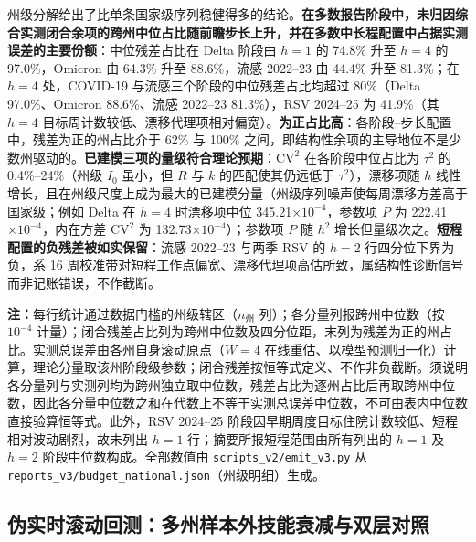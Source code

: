 \documentclass[11pt,a4paper]{article}
\theoremstyle{plain}
\theoremstyle{definition}
\begin{document}
州级分解给出了比单条国家级序列稳健得多的结论。\textbf{在多数报告阶段中，未归因综合实测闭合余项的跨州中位占比随前瞻步长上升，并在多数中长程配置中占据实测误差的主要份额}：中位残差占比在 Delta 阶段由 $h=1$ 的 74.8\% 升至 $h=4$ 的 97.0\%，Omicron 由 64.3\% 升至 88.6\%，流感 2022--23 由 44.4\% 升至 81.3\%；在 $h=4$ 处，COVID-19 与流感三个阶段的中位残差占比均超过 80\%（Delta 97.0\%、Omicron 88.6\%、流感 2022--23 81.3\%），RSV 2024--25 为 41.9\%（其 $h=4$ 目标周计数较低、漂移代理项相对偏宽）。\textbf{为正占比高}：各阶段--步长配置中，残差为正的州占比介于 62\% 与 100\% 之间，即结构性余项的主导地位不是少数州驱动的。\textbf{已建模三项的量级符合理论预期}：$\text{CV}^2$ 在各阶段中位占比为 $\tau^2$ 的 0.4\%--24\%（州级 $I_0$ 虽小，但 $R$ 与 $k$ 的匹配使其仍远低于 $\tau^2$），漂移项随 $h$ 线性增长，且在州级尺度上成为最大的已建模分量（州级序列噪声使每周漂移方差高于国家级；例如 Delta 在 $h=4$ 时漂移项中位 345.21$\times10^{-4}$，参数项 $P$ 为 222.41$\times10^{-4}$，内在方差 $\text{CV}^2$ 为 132.73$\times10^{-4}$）；参数项 $P$ 随 $h^2$ 增长但量级次之。\textbf{短程配置的负残差被如实保留}：流感 2022--23 与两季 RSV 的 $h=2$ 行四分位下界为负，系 16 周校准带对短程工作点偏宽、漂移代理项高估所致，属结构性诊断信号而非记账错误，不作截断。

\begin{table}[htbp]
\centering
\footnotesize
\caption{四项预测误差记账的州级分解（各分量绝对值 $\times 10^{-4}$ 的中位数与闭合残差占比分布）}
\label{tab:budget_four}
\resizebox{\textwidth}{!}{%
%
}
\vspace{2pt}
\begin{flushleft}
\scriptsize \textbf{注：}每行统计通过数据门槛的州级辖区（$n_{\text{州}}$ 列）；各分量列报跨州中位数（按 $10^{-4}$ 计量）；闭合残差占比列为跨州中位数及四分位距，末列为残差为正的州占比。实测总误差由各州自身滚动原点（$W=4$ 在线重估、以模型预测归一化）计算，理论分量取该州阶段级参数；闭合残差按恒等式定义、不作非负截断。须说明各分量列与实测列均为跨州独立取中位数，残差占比为逐州占比后再取跨州中位数，因此各分量中位数之和在代数上不等于实测总误差中位数，不可由表内中位数直接验算恒等式。此外，RSV 2024--25 阶段因早期周度目标住院计数较低、短程相对波动剧烈，故未列出 $h=1$ 行；摘要所报短程范围由所有列出的 $h=1$ 及 $h=2$ 阶段中位数构成。全部数值由 \texttt{scripts\_v2/emit\_v3.py} 从 \texttt{reports\_v3/budget\_national.json}（州级明细）生成。\end{flushleft}
\end{table}

\subsection{伪实时滚动回测：多州样本外技能衰减与双层对照}\label{sec:rolling_eval}
\end{document}
